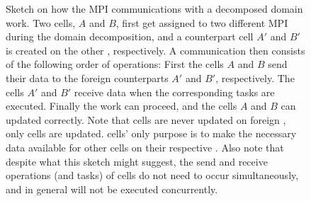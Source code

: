 \begin{figure}
 \caption{
Sketch on how the MPI communications with a decomposed domain work. Two cells, $A$ and $B$, first
get assigned to two different MPI  during the domain decomposition, and a
 counterpart cell $A'$ and $B'$ is created on the other , respectively.
A
communication then consists of the following order of operations: First the  cells $A$
and $B$ send their data to the foreign counterparts $A'$ and $B'$, respectively. The
cells $A'$ and $B'$ receive data when the corresponding  tasks are executed. Finally
the work can proceed, and the  cells $A$ and $B$ can updated correctly. Note that
 cells are never updated on foreign , only  cells are
updated.  cells' only purpose is to make the necessary data available for other
 cells on their respective . Also note that despite what this sketch might
suggest, the send and receive operations (and tasks) of cells do not need to occur simultaneously,
and in general will not be executed concurrently.
 }
 \label{fig:mpi-comm}
\end{figure}



